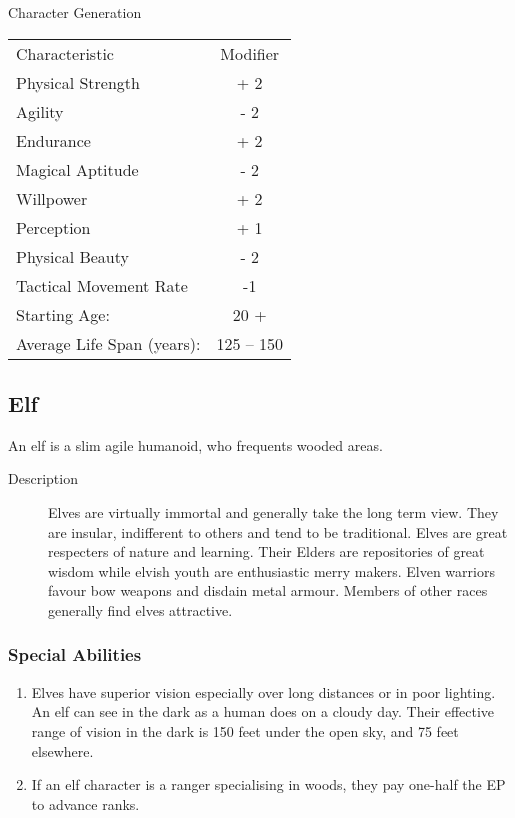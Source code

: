 \begin{Chapter}{Character Generation}
\begin{enumerate}
\end{enumerate}

\begin{tabularx}{\columnwidth}{Xc} 
Characteristic			& Modifier \\
Physical Strength		& + 2 \\
Agility				& - 2 \\
Endurance			& + 2 \\
Magical Aptitude		& - 2 \\
Willpower			& + 2 \\
Perception			& + 1 \\
Physical Beauty			& - 2 \\
Tactical Movement Rate		& -1 \\
Starting Age:			& 20 + \\
Average Life Span (years):	& 125 -- 150 \\
\end{tabularx}

\subsection{Elf}

An elf is a slim agile humanoid, who frequents wooded areas.

\begin{description}
\item[Description] Elves are virtually immortal and generally take the
  long term view.  They are insular, indifferent to others and tend to
  be traditional.  Elves are great respecters of nature and learning.
  Their Elders are repositories of great wisdom while elvish youth are
  enthusiastic merry makers.  Elven warriors favour bow weapons and
  disdain metal armour.  Members of other races generally find elves
  attractive.
\end{description}

\subsubsection{Special Abilities}

\begin{enumerate}
\item Elves have superior vision especially over long distances or in
  poor lighting.  An elf can see in the dark as a human does on a
  cloudy day. Their effective range of vision in the dark is 150 feet
  under the open sky, and 75 feet elsewhere.

\item If an elf character is a ranger specialising in woods, they pay
  one-half the EP to advance ranks.


\end{enumerate}
\end{Chapter}
